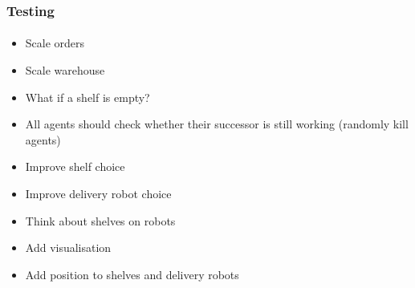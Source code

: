 \documentclass{beamer}
\begin{document}
\begin{frame}[fragile]
\frametitle{Testing}
\framesubtitle{}

\begin{itemize}
\item Scale orders
\item Scale warehouse
\item What if a shelf is empty?
\item All agents should check whether their successor is still working (randomly kill agents)
\item Improve shelf choice
\item Improve delivery robot choice
\item Think about shelves on robots
\item Add visualisation
\item Add position to shelves and delivery robots
\end{itemize}

\end{frame}





%


%
\end{document}
